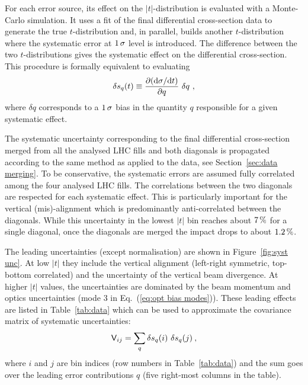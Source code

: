 For each error source, its effect on the $|t|$-distribution is evaluated with a Monte-Carlo simulation. It uses a fit of the final differential cross-section data to generate the true $t$-distribution and, in parallel, builds another $t$-distribution where the systematic error at $1\,{\rm \sigma}$ level is introduced. The difference between the two $t$-distributions gives the systematic effect on the differential cross-section. This procedure is formally equivalent to evaluating
\begin{equation}
\label{eq:syst mode}
\delta s_{q}(t) \equiv \frac{\partial({\rm d}\sigma/{\rm d} t)}{\partial q}\ \delta q\ ,
\end{equation}
where $\delta q$ corresponds to a $1\,{\rm \sigma}$ bias in the quantity $q$ responsible for a given systematic effect.

The systematic uncertainty corresponding to the final differential cross-section merged from all the analysed LHC fills and both diagonals is propagated according to the same method as applied to the data, see Section~\ref{sec:data merging}. To be conservative, the systematic errors are assumed fully correlated among the four analysed LHC fills. The correlations between the two diagonals are respected for each systematic effect. This is particularly important for the vertical (mis)-alignment which is predominantly anti-correlated between the diagonals. While this uncertainty in the lowest $|t|$ bin reaches about $7\,{\rm \%}$ for a single diagonal, once the diagonals are merged the impact drops to about $1.2\,{\rm \%}$.

The leading uncertainties (except normalisation) are shown in Figure~\ref{fig:syst unc}. At low $|t|$ they include the vertical alignment (left-right symmetric, top-bottom correlated) and the uncertainty of the vertical beam divergence. At higher $|t|$ values, the uncertainties are dominated by the beam momentum and optics uncertainties (mode 3 in Eq.~(\ref{eq:opt bias modes})). These leading effects are listed in Table~\ref{tab:data} which can be used to approximate the covariance matrix of systematic uncertainties:
\begin{equation}
\label{eq:covar mat}
\mathsf{V}_{ij} = \sum_{q} \delta s_{q}(i)\ \delta s_{q}(j)\: ,
\end{equation}
where $i$ and $j$ are bin indices (row numbers in Table~\ref{tab:data}) and the sum goes over the leading error contributions $q$ (five right-most columns in the table).


